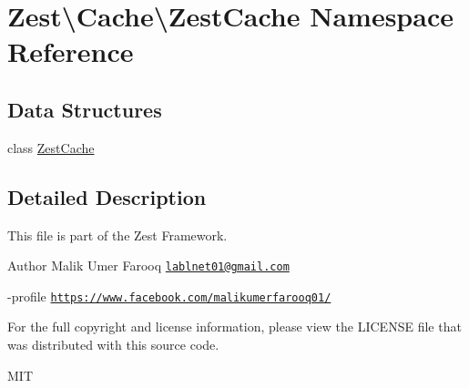 \hypertarget{namespace_zest_1_1_cache_1_1_zest_cache}{}\section{Zest\textbackslash{}Cache\textbackslash{}Zest\+Cache Namespace Reference}
\label{namespace_zest_1_1_cache_1_1_zest_cache}
\subsection*{Data Structures}
\begin{DoxyCompactItemize}
\item 
class \mbox{\hyperlink{class_zest_1_1_cache_1_1_zest_cache_1_1_zest_cache}{Zest\+Cache}}
\end{DoxyCompactItemize}


\subsection{Detailed Description}
This file is part of the Zest Framework.

\begin{DoxyAuthor}{Author}
Malik Umer Farooq \href{mailto:lablnet01@gmail.com}{\tt lablnet01@gmail.\+com} 

-\/profile \href{https://www.facebook.com/malikumerfarooq01/}{\tt https\+://www.\+facebook.\+com/malikumerfarooq01/}
\end{DoxyAuthor}
For the full copyright and license information, please view the L\+I\+C\+E\+N\+SE file that was distributed with this source code.

M\+IT 